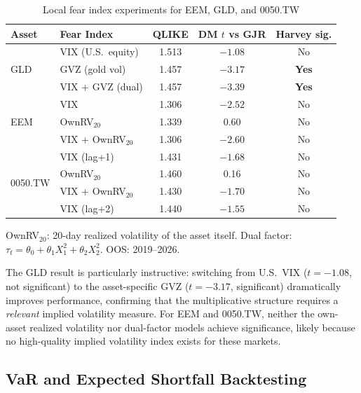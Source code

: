 \documentclass[12pt,a4paper]{article}
\begin{document}
\begin{table}[H]
\centering
\caption{Local fear index experiments for EEM, GLD, and 0050.TW}
\label{tab:local_fear}
\begin{threeparttable}
\small
\begin{tabular}{@{}llccc@{}}
\toprule
Asset & Fear Index & QLIKE & DM $t$ vs GJR & Harvey sig. \\
\midrule
\multirow{3}{*}{GLD} & VIX (U.S.\ equity) & 1.513 & $-1.08$ & No \\
                      & GVZ (gold vol) & 1.457 & $-3.17$ & \textbf{Yes} \\
                      & VIX + GVZ (dual) & 1.457 & $-3.39$ & \textbf{Yes} \\
\midrule
\multirow{3}{*}{EEM} & VIX & 1.306 & $-2.52$ & No \\
                      & OwnRV$_{20}$ & 1.339 & 0.60 & No \\
                      & VIX + OwnRV$_{20}$ & 1.306 & $-2.60$ & No \\
\midrule
\multirow{4}{*}{0050.TW} & VIX (lag+1) & 1.431 & $-1.68$ & No \\
                          & OwnRV$_{20}$ & 1.460 & 0.16 & No \\
                          & VIX + OwnRV$_{20}$ & 1.430 & $-1.70$ & No \\
                          & VIX (lag+2) & 1.440 & $-1.55$ & No \\
\bottomrule
\end{tabular}
\begin{tablenotes}
\footnotesize
\item OwnRV$_{20}$: 20-day realized volatility of the asset itself. Dual factor: $\tau_t = \theta_0 + \theta_1 X_1^2 + \theta_2 X_2^2$. OOS: 2019--2026.
\end{tablenotes}
\end{threeparttable}
\end{table}

The GLD result is particularly instructive: switching from U.S.\ VIX ($t = -1.08$, not significant) to the asset-specific GVZ ($t = -3.17$, significant) dramatically improves performance, confirming that the multiplicative structure requires a \emph{relevant} implied volatility measure. For EEM and 0050.TW, neither the own-asset realized volatility nor dual-factor models achieve significance, likely because no high-quality implied volatility index exists for these markets.

\subsection{VaR and Expected Shortfall Backtesting}
\label{sec:var_es}
\end{document}
